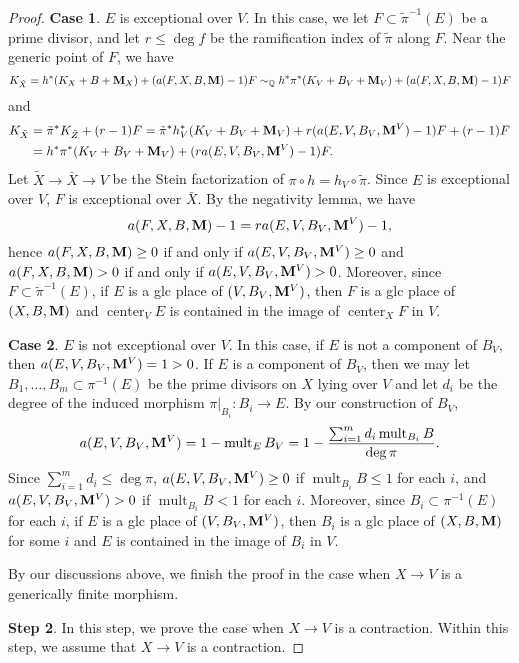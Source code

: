 \documentclass[11pt]{amsart}
\numberwithin{equation}{section}
\newcommand{\Mm}{{\bf{M}}}
\newcommand{\Qq}{\mathbb{Q}}
\newcommand{\Center}{\operatorname{center}}
\newcommand{\mult}{\operatorname{mult}}
\theoremstyle{definition}
\theoremstyle{definition}
\theoremstyle{definition}
\begin{document}
\begin{proof}
\noindent\textbf{Case 1}. $E$ is exceptional over $V$. In this case, we let $F\subset\tilde\pi^{-1}(E)$ be a prime divisor, and let $r\leq\deg f$ be the ramification index of $\tilde\pi$ along $F$. Near the generic point of $F$, we have
$$K_{\tilde X}=h^*(K_X+B+\Mm_X)+(a(F,X,B,\Mm)-1)F\sim_{\Qq}h^*\pi^*(K_V+B_V+\Mm_V)+(a(F,X,B,\Mm)-1)F$$
and
\begin{align*}
 K_{\tilde X}&=\tilde\pi^*K_{\tilde Z}+(r-1)F=\tilde\pi^*h_V^*(K_V+B_V+\Mm_V)+r(a(E,V,B_V,\Mm^V)-1)F+(r-1)F\\
 &=h^*\pi^*(K_V+B_V+\Mm_V)+(ra(E,V,B_V,\Mm^V)-1)F.
\end{align*}
Let $\tilde X\rightarrow \bar X\rightarrow V$ be the Stein factorization of $\pi\circ h=h_V\circ\tilde\pi$. Since $E$ is exceptional over $V$, $F$ is exceptional over $\bar X$. By the negativity lemma, we have
$$a(F,X,B,\Mm)-1=ra(E,V,B_V,\Mm^V)-1,$$
hence $a(F,X,B,\Mm)\geq 0$ if and only if $a(E,V,B_V,\Mm^V)\geq 0$ and $a(F,X,B,\Mm)>0$ if and only if $a(E,V,B_V,\Mm^V)>0$. Moreover, since $F\subset\tilde\pi^{-1}(E)$, if $E$ is a glc place of $(V,B_V,\Mm^V)$, then $F$ is a glc place of $(X,B,\Mm)$ and $\Center_VE$ is contained in the image of $\Center_XF$ in $V$. 

\medskip

\noindent\textbf{Case 2}. $E$ is not exceptional over $V$. In this case, if $E$ is not a component of $B_V$, then $a(E,V,B_V,\Mm^V)=1>0$. If $E$ is a component of $B_V$, then we may let $B_1,\dots,B_m\subset\pi^{-1}(E)$ be the prime divisors on $X$ lying over $V$ and let $d_i$ be the degree of the induced morphism $\pi|_{B_i}: B_i\rightarrow E$. By our construction of $B_V$, 
$$a(E,V,B_V,\Mm^V)=1-\mult_EB_V=1-\frac{\sum_{i=1}^md_i\mult_{B_i}B}{\deg\pi}.$$
Since $\sum_{i=1}^m d_i\leq\deg\pi$, $a(E,V,B_V,\Mm^V)\geq 0$ if $\mult_{B_i}B\leq 1$ for each $i$, and $a(E,V,B_V,\Mm^V)>0$ if $\mult_{B_i}B<1$ for each $i$. Moreover, since $B_i\subset\pi^{-1}(E)$ for each $i$, if $E$ is a glc place of $(V,B_V,\Mm^V)$, then $B_i$ is a glc place of $(X,B,\Mm)$ for some $i$ and $E$ is contained in the image of $B_i$ in $V$.

\medskip

By our discussions above, we finish the proof in the case when $X\rightarrow V$ is a generically finite morphism.

\medskip

\noindent\textbf{Step 2}. In this step, we prove the case when $X\rightarrow V$ is a contraction. Within this step, we assume that $X\rightarrow V$ is a contraction.


\end{proof}
\end{document}
